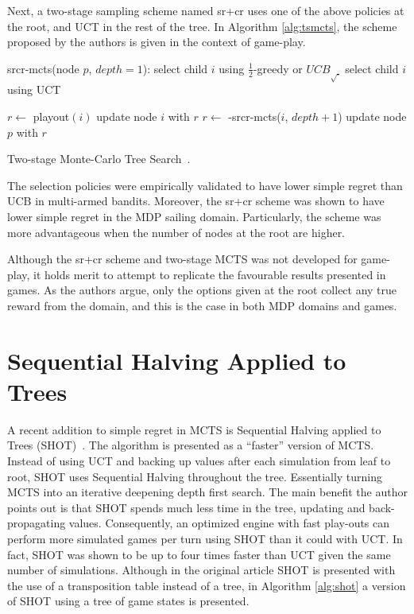 \documentclass{kecsmstr}
\newcommand{\func}[1]{{\sc #1}}
\begin{document}
Next, a two-stage sampling scheme named {\sc sr+cr} uses one of the above policies at the root, and UCT in the rest of the tree. In Algorithm \ref{alg:tsmcts}, the scheme proposed by the authors is given in the context of game-play.
\IncMargin{1em}
\begin{algorithm2e}[ht]
	\func{srcr-mcts}(node $p$, $depth = 1$):														\;
	\Indp							
	 {
	select child $i$ using $\frac{1}{2}$-greedy or ${UCB}_{\sqrt{.}}$								\;
	}
	{
	select child $i$ using UCT 																		\;
	}

     {
    	$r \gets$ {\sc playout}$(i)$ 																\;
    	\func{update} node $i$ with $r$																\;
    }
    {
    	$r \gets$ -\func{srcr-mcts}($i$, $depth + 1$)												\;
    }	
    \func{update} node $p$ with $r$																	\;
	\Indm
  \caption[Two-stage Monte-Carlo Tree Search]{Two-stage Monte-Carlo Tree Search~\protect{}. \label{alg:tsmcts}}
\end{algorithm2e}
\DecMargin{1em}

The selection policies were empirically validated to have lower simple regret than UCB in multi-armed bandits. Moreover, the {\sc sr+cr} scheme was shown to have lower simple regret in the MDP sailing domain. Particularly, the scheme was more advantageous when the number of nodes at the root are higher.

Although the {\sc sr+cr} scheme and two-stage MCTS was not developed for game-play, it holds merit to attempt to replicate the favourable results presented in games. As the authors argue, only the options given at the root collect any true reward from the domain, and this is the case in both MDP domains and games.
\newpage
\section{Sequential Halving Applied to Trees}
\label{sec:SHOT}

A recent addition to simple regret in MCTS is Sequential Halving applied to Trees (SHOT)~. The algorithm is presented as a ``faster'' version of MCTS.  Instead of using UCT and backing up values after each simulation from leaf to root, SHOT uses Sequential Halving throughout the tree. Essentially turning MCTS into an iterative deepening depth first search. The main benefit the author points out is that SHOT spends much less time in the tree, updating and back-propagating values. Consequently, an optimized engine with fast play-outs can perform more simulated games per turn using SHOT than it could with UCT. In fact, SHOT was shown to be up to four times faster than UCT given the same number of simulations. Although in the original article SHOT is presented with the use of a transposition table instead of a tree, in Algorithm \ref{alg:shot} a version of SHOT using a tree of game states is presented.
\end{document}
